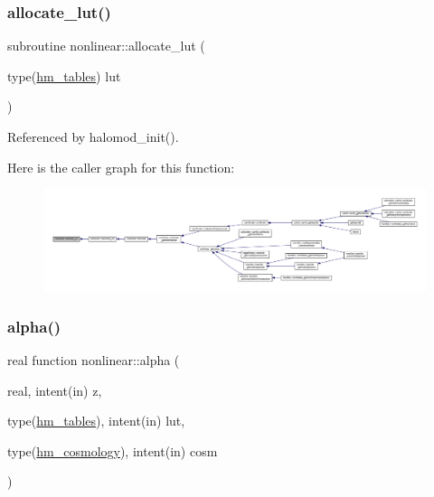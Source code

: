 \subsubsection{\texorpdfstring{allocate\+\_\+lut()}{allocate\_lut()}}
{\footnotesize\ttfamily subroutine nonlinear\+::allocate\+\_\+lut (\begin{DoxyParamCaption}\item[{type(\mbox{\hyperlink{structnonlinear_1_1hm__tables}{hm\+\_\+tables}})}]{lut }\end{DoxyParamCaption})\hspace{0.3cm}{\ttfamily [private]}}



Referenced by halomod\+\_\+init().

Here is the caller graph for this function\+:
\nopagebreak
\begin{figure}[H]
\begin{center}
\leavevmode
\includegraphics[width=350pt]{namespacenonlinear_ac9ae18bd4ed466f0f8287e5c4757bec9_icgraph}
\end{center}
\end{figure}
\mbox{\label{namespacenonlinear_a31039036014feacf6b5001228cbecf2d}} 
\subsubsection{\texorpdfstring{alpha()}{alpha()}}
{\footnotesize\ttfamily real function nonlinear\+::alpha (\begin{DoxyParamCaption}\item[{real, intent(in)}]{z,  }\item[{type(\mbox{\hyperlink{structnonlinear_1_1hm__tables}{hm\+\_\+tables}}), intent(in)}]{lut,  }\item[{type(\mbox{\hyperlink{structnonlinear_1_1hm__cosmology}{hm\+\_\+cosmology}}), intent(in)}]{cosm }\end{DoxyParamCaption})\hspace{0.3cm}{\ttfamily [private]}}



